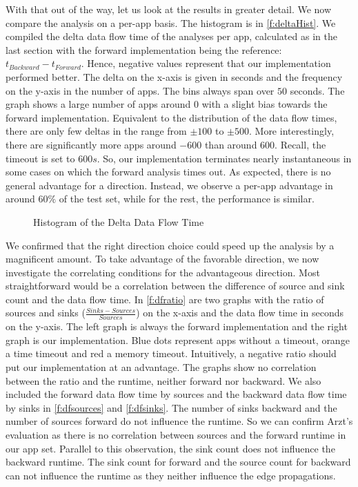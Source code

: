 \documentclass[../draft.tex]{subfiles}
\begin{document}
    With that out of the way, let us look at the results in greater detail. We now compare the analysis on a per-app basis.
    The histogram is in \autoref{f:deltaHist}.
    We compiled the delta data flow time of the analyses per app, calculated as in the last section with the forward implementation being the reference: $t_{\mathit{Backward}} - t_{\mathit{Forward}}$.
    Hence, negative values represent that our implementation performed better.
    The delta on the x-axis is given in seconds and the frequency on the y-axis in the number of apps.
    The bins always span over $50$ seconds.
    The graph shows a large number of apps around $0$ with a slight bias towards the forward implementation.
    Equivalent to the distribution of the data flow times, there are only few deltas in the range from $\pm100$ to $\pm500$.
    More interestingly, there are significantly more apps around $-600$ than around $600$.
    Recall, the timeout is set to $600s$.
    So, our implementation terminates nearly instantaneous in some cases on which the forward analysis times out.
    As expected, there is no general advantage for a direction.
    Instead, we observe a per-app advantage in around $60\%$ of the test set, while for the rest, the performance is similar.

    \begin{figure}[tbp]
        \centering
        \resizebox{0.75\columnwidth}{!}{
            
        }
        \caption{Histogram of the Delta Data Flow Time}
        \label{f:deltaHist}
    \end{figure}

    We confirmed that the right direction choice could speed up the analysis by a magnificent amount. To take advantage of the favorable direction, we now investigate the correlating conditions for the advantageous direction.
    Most straightforward would be a correlation between the difference of source and sink count and the data flow time.
    In \autoref{f:dfratio} are two graphs with the ratio of sources and sinks ($\frac{\mathit{Sinks} - \mathit{Sources}}{\mathit{Sources}}$) on the x-axis and the data flow time in seconds on the y-axis.
    The left graph is always the forward implementation and the right graph is our implementation.
    Blue dots represent apps without a timeout, orange a time timeout and red a memory timeout.
    Intuitively, a negative ratio should put our implementation at an advantage. The graphs show no correlation between the ratio and the runtime, neither forward nor backward.
    We also included the forward data flow time by sources and the backward data flow time by sinks in \autoref{f:dfsources} and \autoref{f:dfsinks}.
    The number of sinks backward and the number of sources forward do not influence the runtime.
    So we can confirm Arzt's evaluation\cite{Arzt2017PhD} as there is no correlation between sources and the forward runtime in our app set.
    Parallel to this observation, the sink count does not influence the backward runtime.
    The sink count for forward and the source count for backward can not influence the runtime as they neither influence the edge propagations.
\end{document}
